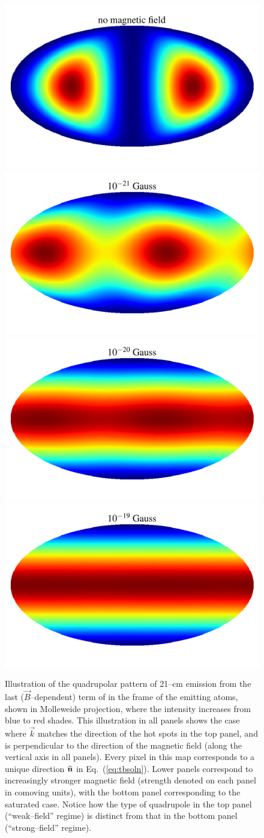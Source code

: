 \begin{figure}
\centering
\includegraphics[width=.35\textwidth,keepaspectratio=true]{hp_B_0e+00G.pdf}
\includegraphics[width=.35\textwidth,keepaspectratio=true]{hp_B_1e-18G.pdf}
\includegraphics[width=.35\textwidth,keepaspectratio=true]{hp_B_1e-17G.pdf}
\includegraphics[width=.35\textwidth,keepaspectratio=true]{hp_B_1e-16G.pdf}
\caption{Illustration of the quadrupolar pattern of 21--cm emission from the last ($\vec B$--dependent) term of \eq{\ref{eq:tbsoln}} in the frame of the emitting atoms, shown in Molleweide projection, where the intensity increases from blue to red shades. This illustration in all panels shows the case where $\vec k$ matches the direction of the hot spots in the top panel, and is perpendicular to the direction of the magnetic field (along the vertical axis in all panels). Every pixel in this map corresponds to a unique direction $\bf{\widehat n}$ in Eq.~(\ref{eq:tbsoln}). Lower panels correspond to increasingly stronger magnetic field (strength denoted on each panel in comoving units), with the bottom panel corresponding to the saturated case. Notice how the type of quadrupole in the top panel (``weak--field'' regime) is distinct from that in the bottom panel  (``strong--field'' regime). \label{fig:hp}}
\end{figure}

